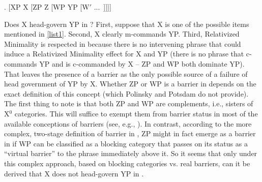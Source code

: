 \documentclass[output=paper
,modfonts
,nonflat]{langsci/langscibook}
\begin{document}
\Lsciexi. [XP X [ZP \label{vcp}Z [WP YP [W$'$ ...~]]]]

Does X head-govern YP in \Last? First, suppose that X is one of the
possible items mentioned in \ref{list1}. Second, X clearly m-commands
YP. Third, Relativized Minimality is respected in \Last because there
is no intervening phrase that could induce a Relativized Minimality
effect for X and YP (there is no phrase that c-commands YP and is
c-commanded by X -- ZP and WP both dominate YP). That leaves the
presence of a barrier as the only possible source of a failure of
head government of YP by X. Whether ZP or WP is a barrier in \Last
depends on the exact definition of this concept (which Polinsky and
Potsdam do not provide). The first thing to note is that both ZP and
WP are complements, i.e., sisters of X$^0$ categories. This will
suffice to exempt them from barrier status in most of the available
conceptions of barriers (see, e.g., \cite{Cinque:90}). In contrast,
according to the more complex, two-stage definition of barrier in
\cite{Chomsky:86}, ZP might in fact emerge as a barrier in \Last if WP
can be classified as a blocking category that passes on its status as
a ``virtual barrier'' to the phrase immediately above it. So it seems
that only under this complex approach, based on blocking categories
vs. real barriers, can it be derived that X does not head-govern YP in
\Last. 
\end{document}
